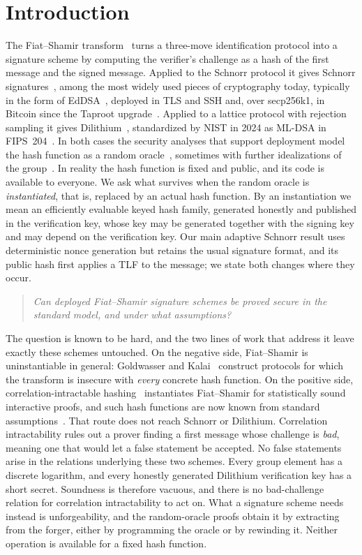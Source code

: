 \section{Introduction} \label{sec-intro}

The Fiat--Shamir transform~\cite{C:FiaSha86} turns a three-move identification protocol into a signature scheme by computing the verifier's challenge as a hash of the first message and the signed message. Applied to the Schnorr protocol it gives Schnorr signatures~\cite{C:Schnorr89}, among the most widely used pieces of cryptography today, typically in the form of EdDSA~\cite{eddsa}, deployed in TLS and SSH and, over secp256k1, in Bitcoin since the Taproot upgrade~\cite{add:BIP340}. Applied to a lattice protocol with rejection sampling it gives Dilithium~\cite{Dilithium}, standardized by NIST in 2024 as ML-DSA in FIPS~204~\cite{FIPS204}. In both cases the security analyses that support deployment model the hash function as a random oracle~\cite{CCS:BelRog93}, sometimes with further idealizations of the group~\cite{EC:FucPloSeu20,JMC:NevSmaWar09,EPRINT:Shoup23,C:CLMQ21}. In reality the hash function is fixed and public, and its code is available to everyone. We ask what survives when the random oracle is \emph{instantiated}, that is, replaced by an actual hash function. By an instantiation we mean an efficiently evaluable keyed hash family, generated honestly and published in the verification key, whose key may be generated together with the signing key and may depend on the verification key. Our main adaptive Schnorr result uses deterministic nonce generation but retains the usual signature format, and its public hash first applies a TLF to the message; we state both changes where they occur.
\begin{quote}
\emph{Can deployed Fiat--Shamir signature schemes be proved secure in the standard model, and under what assumptions?}
\end{quote}

The question is known to be hard, and the two lines of work that address it leave exactly these schemes untouched. On the negative side, Fiat--Shamir is uninstantiable in general: Goldwasser and Kalai~\cite{FOCS:GolKal03} construct protocols for which the transform is insecure with \emph{every} concrete hash function. On the positive side, correlation-intractable hashing~\cite{JACM:CanGolHal04} instantiates Fiat--Shamir for statistically sound interactive proofs, and such hash functions are now known from standard assumptions~\cite{EC:CCRR18,STOC:CCHLRRW19,C:PeiShi19}. That route does not reach Schnorr or Dilithium. Correlation intractability rules out a prover finding a first message whose challenge is \emph{bad}, meaning one that would let a false statement be accepted. No false statements arise in the relations underlying these two schemes. Every group element has a discrete logarithm, and every honestly generated Dilithium verification key has a short secret. Soundness is therefore vacuous, and there is no bad-challenge relation for correlation intractability to act on. What a signature scheme needs instead is unforgeability, and the random-oracle proofs obtain it by extracting from the forger, either by programming the oracle or by rewinding it. Neither operation is available for a fixed hash function.

